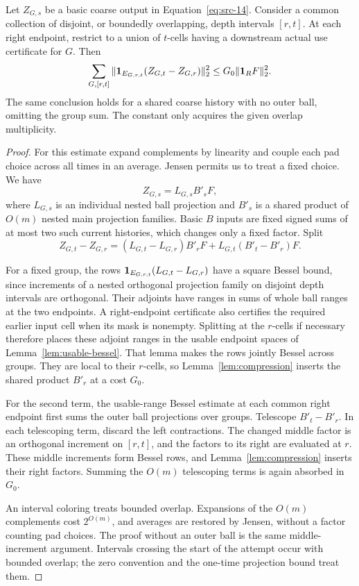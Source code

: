 \begin{lemma}
\label{lem:sides-variation}
Let $Z_{G,s}$ be a basic coarse output in
Equation~\eqref{eq:src-14}.  Consider a common collection of disjoint,
or boundedly overlapping, depth intervals $[r,t]$.  At each right
endpoint, restrict to a union of $t$-cells having a downstream actual
use certificate for $G$.  Then
\[
 \sum_{G,[r,t]}\|
  \mathbf 1_{E_{G,r,t}}(Z_{G,t}-Z_{G,r})\|_2^2
 \le G_0\|\mathbf 1_RF\|_2^2.
\]
The same conclusion holds for a shared coarse history with no outer
ball, omitting the group sum.  The constant only acquires the given
overlap multiplicity.
\end{lemma}

\begin{proof}
For this estimate expand complements by linearity and couple each
pad choice across all times in an average.  Jensen permits us to
treat a fixed choice.  We have
\[
 Z_{G,s}=L_{G,s}B'_sF,
\]
where $L_{G,s}$ is an individual nested ball projection and $B'_s$
is a shared product of $O(m)$ nested main projection families.  Basic
$B$ inputs are fixed signed sums of at most two such current
histories, which changes only a fixed factor.  Split
\[
 Z_{G,t}-Z_{G,r}
 =(L_{G,t}-L_{G,r})B'_rF
       +L_{G,t}(B'_t-B'_r)F.
\]

For a fixed group, the rows
$\mathbf 1_{E_{G,r,t}}(L_{G,t}-L_{G,r})$ have a square Bessel bound, since
increments of a nested orthogonal projection family on disjoint
depth intervals are orthogonal.  Their adjoints have ranges in sums
of whole ball ranges at the two endpoints.  A right-endpoint
certificate also certifies the required earlier input cell when its
mask is nonempty.  Splitting at the $r$-cells if necessary therefore
places these adjoint ranges in the usable endpoint spaces of
Lemma~\ref{lem:usable-bessel}.  That lemma makes the rows jointly
Bessel across groups.  They are local to their $r$-cells, so
Lemma~\ref{lem:compression} inserts the shared product $B'_r$ at a
cost $G_0$.

For the second term, the usable-range Bessel estimate at each common
right endpoint first sums the outer ball projections over groups.
Telescope $B'_t-B'_r$.  In each telescoping term, discard the left
contractions.  The changed middle factor is an orthogonal increment
on $[r,t]$, and the factors to its right are evaluated at $r$.
These middle increments form Bessel rows, and
Lemma~\ref{lem:compression} inserts their right factors.  Summing
the $O(m)$ telescoping terms is again absorbed in $G_0$.

An interval coloring treats bounded overlap.  Expansions of the
$O(m)$ complements cost $2^{O(m)}$, and averages are restored by
Jensen, without a factor counting pad choices.  The proof without
an outer ball is the same middle-increment argument.  Intervals
crossing the start of the attempt occur with bounded overlap; the
zero convention and the one-time projection bound treat them.
\end{proof}

